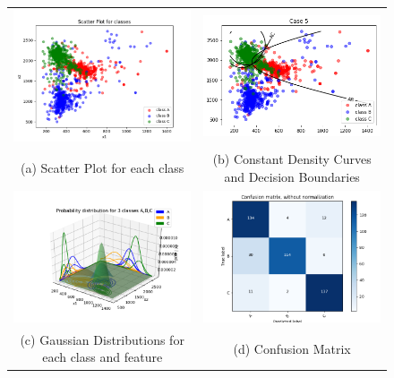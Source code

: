 \begin{figure}[H]
	\hspace*{-2cm}\begin{tabular}{cc}
		\includegraphics[width=70mm]{./dataset3/scatter.png} &   \includegraphics[width=70mm]{./dataset3/decisio.png} \\
		(a) Scatter Plot for each class & (b) Constant Density Curves and Decision Boundaries\\[4pt]
		
		\includegraphics[width=70mm]{./dataset3/PDF.png} &   \includegraphics[width=70mm]{./dataset3/confusionMatrix.png} \\
		(c) Gaussian Distributions for each class and feature & (d) Confusion Matrix \\[4pt]
		

\end{tabular}
\end{figure}

